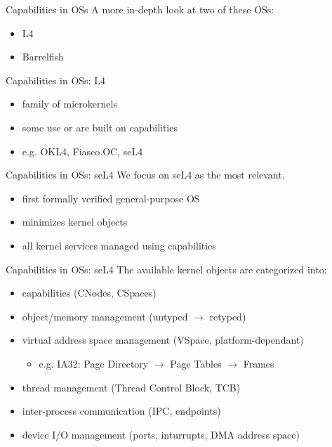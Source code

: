 \documentclass[11pt]{beamer}
\begin{document}
\begin{frame}{Capabilities in OSs}
  \vfill
  A more in-depth look at two of these OSs:
  	\begin{itemize}
          \vfill
	\item L4
	\item Barrelfish
          \vfill
	\end{itemize}
\end{frame}

\begin{frame}{Capabilities in OSs: L4}

  	\begin{itemize}
          \vfill
	\item family of microkernels
          \vfill
	\item some use or are built on capabilities
          \vfill
        \item e.g. OKL4, Fiasco.OC, seL4
          \vfill
	\end{itemize}
\end{frame}

\begin{frame}{Capabilities in OSs: seL4}
  \vfill
  We focus on seL4 as the most relevant.
  \begin{itemize}
    \vfill
  \item first formally verified general-purpose OS
    \vfill
  \item minimizes kernel objects
    \vfill
  \item all kernel services managed using capabilities
    \vfill
  \end{itemize}
\end{frame}

\begin{frame}{Capabilities in OSs: seL4}
  The available kernel objects are categorized into:
  \begin{itemize}
    \vfill
  \item capabilities (CNodes, CSpaces)
    \vfill
  \item object/memory management (untyped $\rightarrow$ retyped)
    \vfill
  \item virtual address space management (VSpace, platform-dependant)
    \begin{itemize}
    \item e.g. IA32: Page Directory $\rightarrow$ Page Tables $\rightarrow$ Frames
    \end{itemize}
    \vfill
  \item thread management (Thread Control Block, TCB)
    \vfill
  \item inter-process communication (IPC, endpoints)
    \vfill
  \item device I/O management (ports, inturrupts, DMA address space)
    \vfill
  \end{itemize}
\end{frame}
\end{document}
